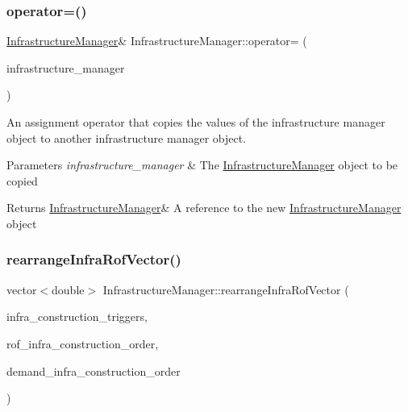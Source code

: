 \subsubsection{\texorpdfstring{operator=()}{operator=()}}
{\footnotesize\ttfamily \mbox{\hyperlink{classInfrastructureManager}{Infrastructure\+Manager}}\& Infrastructure\+Manager\+::operator= (\begin{DoxyParamCaption}\item[{const \mbox{\hyperlink{classInfrastructureManager}{Infrastructure\+Manager}} \&}]{infrastructure\+\_\+manager }\end{DoxyParamCaption})}



An assignment operator that copies the values of the infrastructure manager object to another infrastructure manager object. 


\begin{DoxyParams}{Parameters}
{\em infrastructure\+\_\+manager} & The \mbox{\hyperlink{classInfrastructureManager}{Infrastructure\+Manager}} object to be copied \\
\hline
\end{DoxyParams}
\begin{DoxyReturn}{Returns}
\mbox{\hyperlink{classInfrastructureManager}{Infrastructure\+Manager}}\& A reference to the new \mbox{\hyperlink{classInfrastructureManager}{Infrastructure\+Manager}} object 
\end{DoxyReturn}
\mbox{\label{classInfrastructureManager_a23888a04e8cb5e2fb7a36b2258d4a259}} 
\subsubsection{\texorpdfstring{rearrange\+Infra\+Rof\+Vector()}{rearrangeInfraRofVector()}}
{\footnotesize\ttfamily vector$<$double$>$ Infrastructure\+Manager\+::rearrange\+Infra\+Rof\+Vector (\begin{DoxyParamCaption}\item[{const vector$<$ double $>$ \&}]{infra\+\_\+construction\+\_\+triggers,  }\item[{const vector$<$ int $>$ \&}]{rof\+\_\+infra\+\_\+construction\+\_\+order,  }\item[{const vector$<$ int $>$ \&}]{demand\+\_\+infra\+\_\+construction\+\_\+order }\end{DoxyParamCaption})}



